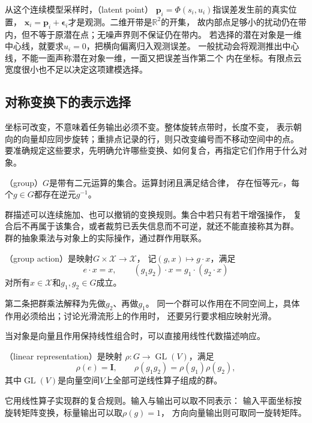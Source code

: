 从这个连续模型采样时，（latent point）
$\bm p_i=\Phi(s_i,u_i)$指误差发生前的真实位置，
$\bm x_i=\bm p_i+\bm\epsilon_i$才是观测。二维开带是$\mathbb R^2$的开集，
故内部点足够小的扰动仍在带内，但不等于原潜在点；无噪声界则不保证仍在带内。
若选择的潜在对象是一维中心线，就要求$u_i=0$，把横向偏离归入观测误差。
一般扰动会将观测推出中心线，不能一面声称潜在对象一维，一面又把误差当作第二个
内在坐标。有限点云宽度很小也不足以决定这项建模选择。

\subsection{对称变换下的表示选择}
\label{sec:geometry-group-invariance-equivariance}

坐标可改变，不意味着任务输出必须不变。整体旋转点带时，长度不变，
表示朝向的向量却应同步旋转；重排点记录的行，则只改变编号而不移动空间中的点。
要准确规定这些要求，先明确允许哪些变换、如何复合，再指定它们作用于什么对象。

\begin{definition}[群]
\label{def:geometry-group}
（group）$G$是带有二元运算的集合。运算封闭且满足结合律，
存在恒等元$e$，每个$g\in G$都存在逆元$g^{-1}$。
\end{definition}
群描述可以连续施加、也可以撤销的变换规则。集合中若只有若干增强操作，
复合后不再属于该集合，或者裁剪已丢失信息而不可逆，就还不能直接称其为群。
群的抽象乘法与对象上的实际操作，通过群作用联系。

\begin{definition}[群作用]
\label{def:geometry-group-action}
（group action）是映射$G\times\mathcal X\to\mathcal X$，
记$(g,x)\mapsto g\cdot x$，满足
\begin{equation}
 e\cdot x=x,\qquad (g_1g_2)\cdot x=g_1\cdot(g_2\cdot x)
 \label{eq:geometry-group-action}
\end{equation}
对所有$x\in\mathcal X$和$g_1,g_2\in G$成立。
\end{definition}
第二条把群乘法解释为先做$g_2$、再做$g_1$。
同一个群可以作用在不同空间上，具体作用必须给出；讨论光滑流形上的作用时，
还要另行要求相应映射光滑。

当对象是向量且作用保持线性组合时，可以直接用线性代数描述响应。
\begin{definition}[线性表示]
\label{def:geometry-linear-representation}
（linear representation）是映射
$\rho:G\to\operatorname{GL}(V)$，满足
\begin{equation}
 \rho(e)=\bm I,\qquad \rho(g_1g_2)=\rho(g_1)\rho(g_2),
 \label{eq:geometry-linear-representation}
\end{equation}
其中$\operatorname{GL}(V)$是向量空间$V$上全部可逆线性算子组成的群。
\end{definition}
它用线性算子实现群的复合规则。输入与输出可以取不同表示：
输入平面坐标按旋转矩阵变换，标量输出可以取$\rho(g)=1$，
方向向量输出则可取同一旋转矩阵。

